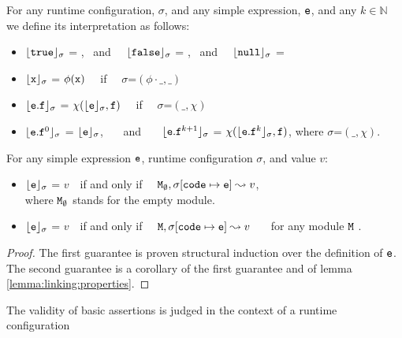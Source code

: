 \begin{definition}[Interpretations]

For any runtime configuration, $\sigma$, and any simple expression, ${\mbox{\tt{e}}}$, and any $k\in \mathbb{N}$ we define its interpretation as follows:

\begin{itemize}
     \item 
  ${\lfloor{ {{\mbox{\tt{true}}}}}\rfloor_{\sigma}}$ = , \ and \ \    ${\lfloor{ {{\mbox{\tt{false}}}}}\rfloor_{\sigma}}$ = , \ and \ \ 
   $\interp {}{\sigma}$ = \prg{null}
  \item
  ${\lfloor{ {{\mbox{\tt{x}}}}}\rfloor_{\sigma}}$ = $\phi({\mbox{\tt{x}}})$  \ \ if \ \ $\sigma$=$(\phi\cdot\_,\_)$
  \item
  ${\lfloor{ {\ensuremath{{\mbox{\tt{e}}}}.{\mbox{\tt{f}}}}}\rfloor_{\sigma}}$ = $\chi({{\lfloor{ {\ensuremath{{\mbox{\tt{e}}}}}}\rfloor_{\sigma}}}, {\mbox{\tt{f}}})$  \ \ if \ \ $\sigma$=$(\_,\chi)$
   \item
     ${\lfloor{ {\ensuremath{{\mbox{\tt{e}}}}.{\mbox{\tt{f}}}^0}}\rfloor_{\sigma}}$ =  ${\lfloor{ {\ensuremath{{\mbox{\tt{e}}}}}}\rfloor_{\sigma}}$, \ \ \ and \ \ \ ${\lfloor{ {\ensuremath{{\mbox{\tt{e}}}}.{\mbox{\tt{f}}}^{k+1}}}\rfloor_{\sigma}}$ =  $\chi({{\lfloor{ {\ensuremath{{\mbox{\tt{e}}}}.{\mbox{\tt{f}}}^k}}\rfloor_{\sigma}}}, {\mbox{\tt{f}}})$, where $\sigma$=$(\_,\chi)$.
   \end{itemize}
\end{definition}

\begin{lemma}
For any simple expression ${\mbox{\tt{e}}}$, runtime configuration $\sigma$, and value $v$:

\begin{itemize}
     \item 
  ${\lfloor{ {\ensuremath{{\mbox{\tt{e}}}}}}\rfloor_{\sigma}}$ = $v$\ \     if and only if \ \ ${\mbox{\tt{\ensuremath{{\mbox{\tt{M}}}}}}}_\emptyset, \sigma[{\mbox{\tt{code}}}\mapsto {\mbox{\tt{e}}}] \leadsto v$,\\
  where ${\mbox{\tt{\ensuremath{{\mbox{\tt{M}}}}}}}_\emptyset$ stands for the empty module.
  \item
   ${\lfloor{ {\ensuremath{{\mbox{\tt{e}}}}}}\rfloor_{\sigma}}$ = $v$\ \     if and only if \ \ ${\mbox{\tt{\ensuremath{{\mbox{\tt{M}}}}}}}, \sigma[{\mbox{\tt{code}}}\mapsto {\mbox{\tt{e}}}] \leadsto v$ \ \ \ for any module ${\mbox{\tt{\ensuremath{{\mbox{\tt{M}}}}}}}$ .
   \end{itemize}
   \end{lemma}
   
   \begin{proof} The  first guarantee is proven structural induction  over the definition of ${\mbox{\tt{e}}}$.
   The second guarantee  is a corollary of the first guarantee  and of lemma \ref{lemma:linking:properties}.\end{proof}


The validity of basic assertions is judged in the context of a runtime configuration

